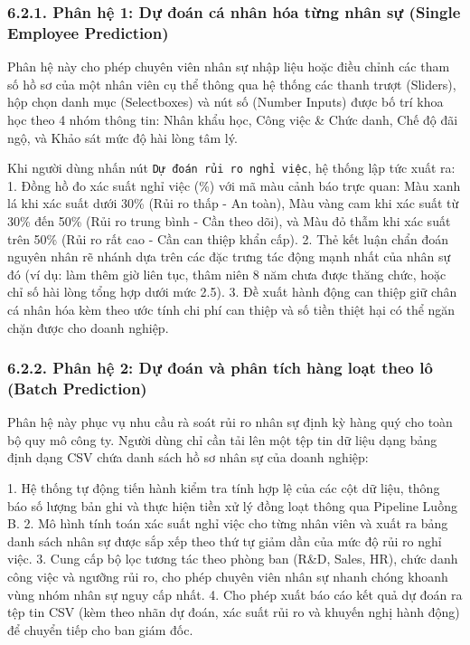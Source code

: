 \documentclass[12pt,a4paper]{article}
\begin{document}
\subsubsection{6.2.1. Phân hệ 1: Dự đoán cá nhân hóa từng nhân sự (Single Employee Prediction)}
Phân hệ này cho phép chuyên viên nhân sự nhập liệu hoặc điều chỉnh các tham số hồ sơ của một nhân viên cụ thể thông qua hệ thống các thanh trượt (Sliders), hộp chọn danh mục (Selectboxes) và nút số (Number Inputs) được bố trí khoa học theo 4 nhóm thông tin: Nhân khẩu học, Công việc \& Chức danh, Chế độ đãi ngộ, và Khảo sát mức độ hài lòng tâm lý.

Khi người dùng nhấn nút \texttt{Dự đoán rủi ro nghỉ việc}, hệ thống lập tức xuất ra:
1. Đồng hồ đo xác suất nghỉ việc (\%) với mã màu cảnh báo trực quan: Màu xanh lá khi xác suất dưới 30\% (Rủi ro thấp - An toàn), Màu vàng cam khi xác suất từ 30\% đến 50\% (Rủi ro trung bình - Cần theo dõi), và Màu đỏ thẫm khi xác suất trên 50\% (Rủi ro rất cao - Cần can thiệp khẩn cấp).
2. Thẻ kết luận chẩn đoán nguyên nhân rẽ nhánh dựa trên các đặc trưng tác động mạnh nhất của nhân sự đó (ví dụ: làm thêm giờ liên tục, thâm niên 8 năm chưa được thăng chức, hoặc chỉ số hài lòng tổng hợp dưới mức 2.5).
3. Đề xuất hành động can thiệp giữ chân cá nhân hóa kèm theo ước tính chi phí can thiệp và số tiền thiệt hại có thể ngăn chặn được cho doanh nghiệp.

\subsubsection{6.2.2. Phân hệ 2: Dự đoán và phân tích hàng loạt theo lô (Batch Prediction)}
Phân hệ này phục vụ nhu cầu rà soát rủi ro nhân sự định kỳ hàng quý cho toàn bộ quy mô công ty. Người dùng chỉ cần tải lên một tệp tin dữ liệu dạng bảng định dạng CSV chứa danh sách hồ sơ nhân sự của doanh nghiệp:

1. Hệ thống tự động tiến hành kiểm tra tính hợp lệ của các cột dữ liệu, thông báo số lượng bản ghi và thực hiện tiền xử lý đồng loạt thông qua Pipeline Luồng B.
2. Mô hình tính toán xác suất nghỉ việc cho từng nhân viên và xuất ra bảng danh sách nhân sự được sắp xếp theo thứ tự giảm dần của mức độ rủi ro nghỉ việc.
3. Cung cấp bộ lọc tương tác theo phòng ban (R\&D, Sales, HR), chức danh công việc và ngưỡng rủi ro, cho phép chuyên viên nhân sự nhanh chóng khoanh vùng nhóm nhân sự nguy cấp nhất.
4. Cho phép xuất báo cáo kết quả dự đoán ra tệp tin CSV (kèm theo nhãn dự đoán, xác suất rủi ro và khuyến nghị hành động) để chuyển tiếp cho ban giám đốc.
\end{document}
